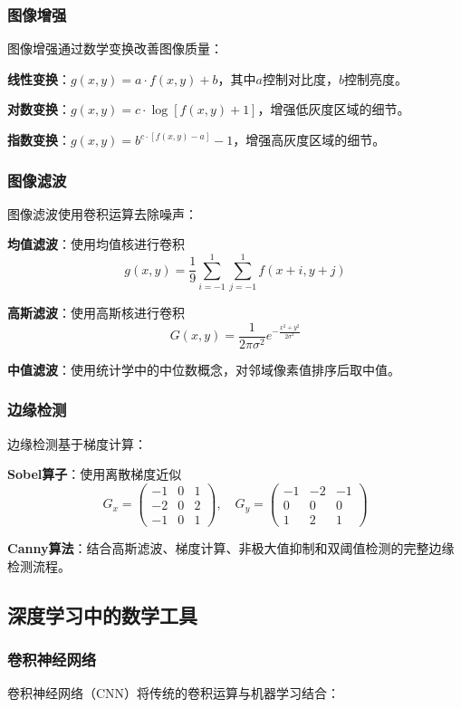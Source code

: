 \subsubsection{图像增强}
图像增强通过数学变换改善图像质量：

\textbf{线性变换}：$g(x,y) = a \cdot f(x,y) + b$，其中$a$控制对比度，$b$控制亮度。

\textbf{对数变换}：$g(x,y) = c \cdot \log[f(x,y) + 1]$，增强低灰度区域的细节。

\textbf{指数变换}：$g(x,y) = b^{c \cdot [f(x,y) - a]} - 1$，增强高灰度区域的细节。

\subsubsection{图像滤波}
图像滤波使用卷积运算去除噪声：

\textbf{均值滤波}：使用均值核进行卷积
$$g(x,y) = \frac{1}{9} \sum_{i=-1}^{1} \sum_{j=-1}^{1} f(x+i, y+j)$$

\textbf{高斯滤波}：使用高斯核进行卷积
$$G(x,y) = \frac{1}{2\pi\sigma^2} e^{-\frac{x^2+y^2}{2\sigma^2}}$$

\textbf{中值滤波}：使用统计学中的中位数概念，对邻域像素值排序后取中值。

\subsubsection{边缘检测}
边缘检测基于梯度计算：

\textbf{Sobel算子}：使用离散梯度近似
$$G_x = \begin{pmatrix} -1 & 0 & 1 \\ -2 & 0 & 2 \\ -1 & 0 & 1 \end{pmatrix}, \quad G_y = \begin{pmatrix} -1 & -2 & -1 \\ 0 & 0 & 0 \\ 1 & 2 & 1 \end{pmatrix}$$

\textbf{Canny算法}：结合高斯滤波、梯度计算、非极大值抑制和双阈值检测的完整边缘检测流程。

\subsection{深度学习中的数学工具}

\subsubsection{卷积神经网络}
卷积神经网络（CNN）将传统的卷积运算与机器学习结合：


